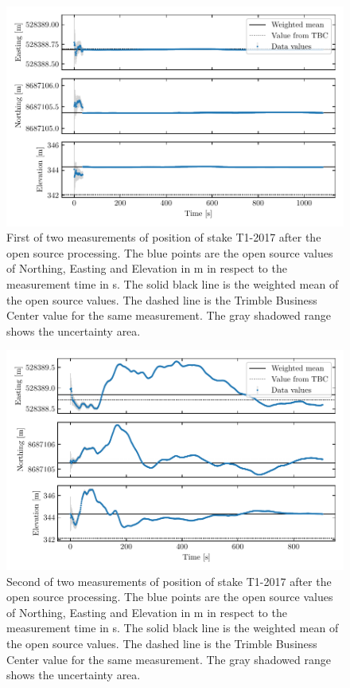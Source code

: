\begin{figure}[H]
    \centering
    \includegraphics[width=\textwidth]{./figs/timeseries/46250700_corr-T1-i-2017_Timeseries-east-north-elev.pdf}
    \caption{First of two measurements of position of stake T1-2017 after the open source processing. The blue points are the open source values of Northing, Easting and Elevation in m in respect to the measurement time in s. The solid black line is the weighted mean of the open source values. The dashed line is the Trimble Business Center value for the same measurement. The gray shadowed range shows the uncertainty area.}
    \label{GPS:fig:T1-i_timeseries}
\end{figure}

\begin{figure}[H]
    \centering
    \includegraphics[width=\textwidth]{./figs/timeseries/46250723_corr-T1-ii-2017_Timeseries-east-north-elev.pdf}
    \caption{Second of two measurements of position of stake T1-2017  after the open source processing. The blue points are the open source values of Northing, Easting and Elevation in m in respect to the measurement time in s. The solid black line is the weighted mean of the open source values. The dashed line is the Trimble Business Center value for the same measurement. The gray shadowed range shows the uncertainty area.}
    \label{GPS:fig:T1-ii_timeseries}
\end{figure}

